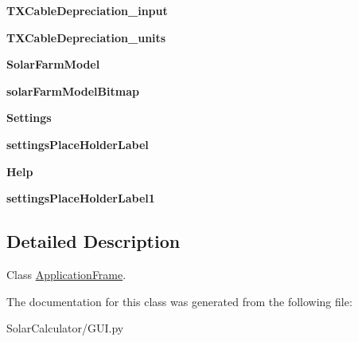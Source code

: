 \begin{DoxyCompactItemize}
\item 
\hypertarget{class_solar_calculator_1_1_g_u_i_1_1_application_frame_a9cb4e63ba5e9ef6918c6cccce4636468}{{\bfseries T\-X\-Cable\-Depreciation\-\_\-input}}\label{class_solar_calculator_1_1_g_u_i_1_1_application_frame_a9cb4e63ba5e9ef6918c6cccce4636468}

\item 
\hypertarget{class_solar_calculator_1_1_g_u_i_1_1_application_frame_ac5287dc33613ed56d5c342aed1894b19}{{\bfseries T\-X\-Cable\-Depreciation\-\_\-units}}\label{class_solar_calculator_1_1_g_u_i_1_1_application_frame_ac5287dc33613ed56d5c342aed1894b19}

\item 
\hypertarget{class_solar_calculator_1_1_g_u_i_1_1_application_frame_a2fa0c20e25393963f9aff6fbcd5d90e1}{{\bfseries Solar\-Farm\-Model}}\label{class_solar_calculator_1_1_g_u_i_1_1_application_frame_a2fa0c20e25393963f9aff6fbcd5d90e1}

\item 
\hypertarget{class_solar_calculator_1_1_g_u_i_1_1_application_frame_acceef6ef67290fd07180364ab6b94269}{{\bfseries solar\-Farm\-Model\-Bitmap}}\label{class_solar_calculator_1_1_g_u_i_1_1_application_frame_acceef6ef67290fd07180364ab6b94269}

\item 
\hypertarget{class_solar_calculator_1_1_g_u_i_1_1_application_frame_a81d5d6ff106069fe12f12781960255ae}{{\bfseries Settings}}\label{class_solar_calculator_1_1_g_u_i_1_1_application_frame_a81d5d6ff106069fe12f12781960255ae}

\item 
\hypertarget{class_solar_calculator_1_1_g_u_i_1_1_application_frame_ad0c8941bf9bb4c11c935f8eaddba81ce}{{\bfseries settings\-Place\-Holder\-Label}}\label{class_solar_calculator_1_1_g_u_i_1_1_application_frame_ad0c8941bf9bb4c11c935f8eaddba81ce}

\item 
\hypertarget{class_solar_calculator_1_1_g_u_i_1_1_application_frame_aa0a42592cec3975ce7e9f51941939405}{{\bfseries Help}}\label{class_solar_calculator_1_1_g_u_i_1_1_application_frame_aa0a42592cec3975ce7e9f51941939405}

\item 
\hypertarget{class_solar_calculator_1_1_g_u_i_1_1_application_frame_ad42854719252de4d5eb45ec9aef14874}{{\bfseries settings\-Place\-Holder\-Label1}}\label{class_solar_calculator_1_1_g_u_i_1_1_application_frame_ad42854719252de4d5eb45ec9aef14874}

\end{DoxyCompactItemize}


\subsection{Detailed Description}
Class \hyperlink{class_solar_calculator_1_1_g_u_i_1_1_application_frame}{Application\-Frame}. 

The documentation for this class was generated from the following file\-:\begin{DoxyCompactItemize}
\item 
Solar\-Calculator/G\-U\-I.\-py\end{DoxyCompactItemize}
